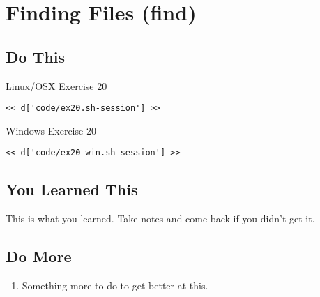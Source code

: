 \chapter{Finding Files (find)}

\section{Do This}

\begin{code}{Linux/OSX Exercise 20}
\begin{Verbatim}
<< d['code/ex20.sh-session'] >>
\end{Verbatim}
\end{code}

\begin{code}{Windows Exercise 20}
\begin{Verbatim}
<< d['code/ex20-win.sh-session'] >>
\end{Verbatim}
\end{code}

\section{You Learned This}

This is what you learned.  Take notes and come back if you didn't get it.

\section{Do More}

\begin{enumerate}
\item Something more to do to get better at this.
\end{enumerate}


